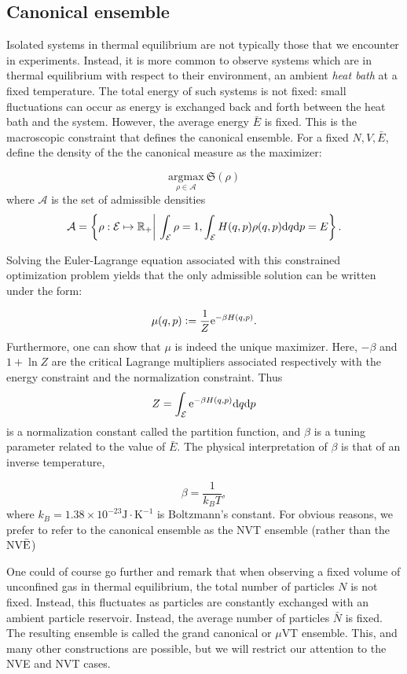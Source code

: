 \subsection{Canonical ensemble}\label{par:canonical ensemble}
    Isolated systems in thermal equilibrium are not typically those that we encounter in experiments. Instead, it is more common to observe systems which are in thermal equilibrium with respect to their environment, an ambient \textit{heat bath} at a fixed temperature.
    The total energy of such systems is not fixed: small fluctuations can occur as energy is exchanged back and forth between the heat bath and the system. However, the average energy $\bar E$ is fixed. 
    This is the macroscopic constraint that defines the canonical ensemble. For a fixed $N,V,\bar E$, define the density of the the canonical measure as the maximizer:

    $$ \underset{\rho \in \mathcal A}{\mathrm{argmax}}\ \mathfrak S(\rho)$$
    where $\mathcal A$ is the set of admissible densities
    $$\mathcal A=\left\{ \rho: \mathcal E \mapsto \mathbb{R}_+ \middle|\ \int_{\mathcal E} \rho =1, \int_{\mathcal E} H(q,p)\rho(q,p)\mathrm{d} q \mathrm{d} p=E \right\}.$$

    Solving the Euler-Lagrange equation associated with this constrained optimization problem yields that the only admissible solution can be written under the form:

    \begin{equation}\label{eq:canonical_measure}\mu(q,p) \mathrel{\mathop:}= \frac 1{Z} \mathrm{e}^{-\beta H(q,p)}.\end{equation}
    Furthermore, one can show that $\mu$ is indeed the unique maximizer.
    Here, $-\beta$ and $1+\ln Z$ are the critical Lagrange multipliers associated respectively with the energy constraint and the normalization constraint. Thus
    $$Z=\int_{\mathcal E} \mathrm{e}^{-\beta H(q,p)}\mathrm{d} q \mathrm{d} p$$
    is a normalization constant called the partition function, and $\beta$ is a tuning parameter related to the value of $\bar E$. The physical interpretation of $\beta$ is that of an inverse temperature,

    $$ \beta = \frac 1{k_B T},$$
    where $k_B=1.38 \times 10 ^{-23} \mathrm{J\cdot K^{-1}}$ is Boltzmann's constant. For obvious reasons, we prefer to refer to the canonical ensemble as the NVT ensemble (rather than the NV$\bar {\text E}$)


One could of course go further and remark that when observing a fixed volume of unconfined gas in thermal equilibrium, the total number of particles $N$ is not fixed. Instead, this fluctuates as particles are constantly exchanged with an ambient particle reservoir. Instead, the average number of particles $\bar N$ is fixed. The resulting ensemble is called the grand canonical or $\mu$VT ensemble. This, and many other constructions are possible, but we will restrict our attention to the NVE and NVT cases. 

